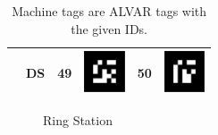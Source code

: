 \documentclass[12pt,twoside]{article}
\begin{document}
\begin{table}[bp]
\begin{tabular}{|l|c|c|c|c|l|}
    &DS&49&\parbox[c]{1.5cm}{\includegraphics[width=1.2cm]{markers/figure_49}}&50&\parbox[c]{1.5cm}{\includegraphics[width=1.2cm]{markers/figure_50}}\\[2.5ex]\hline
  \end{tabular}
  \caption{Machine tags are ALVAR tags with the given IDs.}
  \label{tab:machine-tags}  
\end{table}
\begin{figure}
\centering
{} 
\quad
{}
\vspace{-1ex}
\caption{Ring Station}
\label{fig:RS}
\end{figure}
\end{document}
